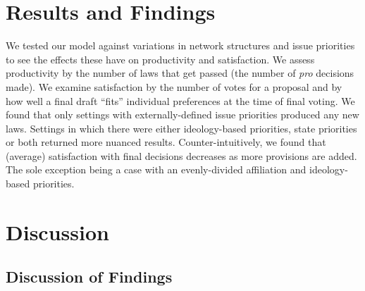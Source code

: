 \documentclass[pdftex,12pt]{llncs}
\begin{document}
\section{Results and Findings} 
%
We tested our model against variations in network structures and issue priorities to see the effects these have on productivity and satisfaction. We assess productivity by the number of laws that get passed (the number of \textit{pro} decisions made). We examine satisfaction by the number of votes for a proposal and by how well a final draft ``fits'' individual preferences at the time of final voting. We found that only settings with externally-defined issue priorities produced any new laws. Settings in which there were either ideology-based priorities, state priorities or both returned more nuanced results. Counter-intuitively, we found that (average) satisfaction with final decisions decreases as more provisions are added. The sole exception being a case with an evenly-divided affiliation and ideology-based priorities.  
 



\section{Discussion}
%

\subsection{Discussion of Findings}
\end{document}
